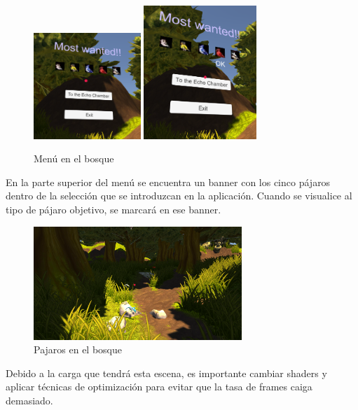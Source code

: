\begin{figure}[htb]
	\centering
	\includegraphics[width=0.36\textwidth]{./imagenes/forestMenu}
	\includegraphics[width=0.38\textwidth]{./imagenes/forestMenuActive}
	\caption{Menú en el bosque}
\end{figure}

\quad En la parte superior del menú se encuentra un banner con los cinco pájaros dentro de la selección que se introduzcan en la aplicación. Cuando se visualice al tipo de pájaro objetivo, se marcará en ese banner.\\

\begin{figure}[htb]
	\centering
	\includegraphics[width=0.7\textwidth]{./imagenes/forestBirds}
	\caption{Pajaros en el bosque}
\end{figure}

\quad Debido a la carga que tendrá esta escena, es importante cambiar shaders y aplicar técnicas de optimización para evitar que la tasa de frames caiga demasiado.

